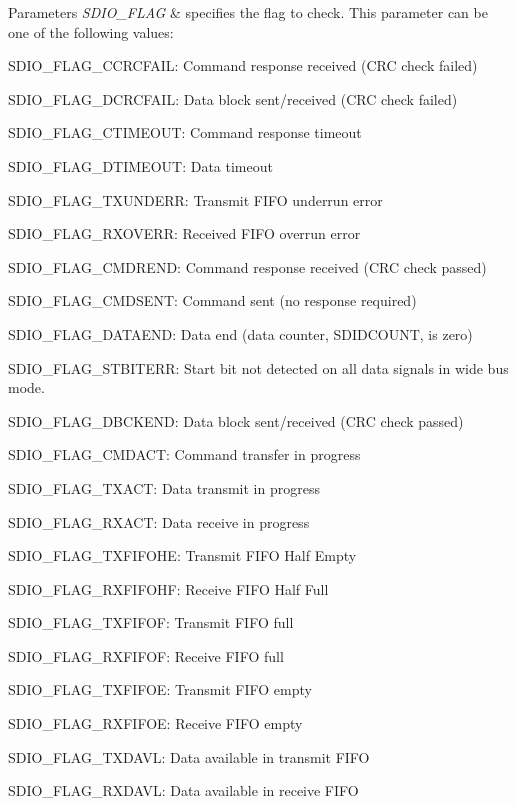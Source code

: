 \begin{DoxyParams}{Parameters}
{\em S\+D\+I\+O\+\_\+\+F\+L\+AG} & specifies the flag to check. This parameter can be one of the following values\+: \begin{DoxyItemize}
\item S\+D\+I\+O\+\_\+\+F\+L\+A\+G\+\_\+\+C\+C\+R\+C\+F\+A\+IL\+: Command response received (C\+RC check failed) \item S\+D\+I\+O\+\_\+\+F\+L\+A\+G\+\_\+\+D\+C\+R\+C\+F\+A\+IL\+: Data block sent/received (C\+RC check failed) \item S\+D\+I\+O\+\_\+\+F\+L\+A\+G\+\_\+\+C\+T\+I\+M\+E\+O\+UT\+: Command response timeout \item S\+D\+I\+O\+\_\+\+F\+L\+A\+G\+\_\+\+D\+T\+I\+M\+E\+O\+UT\+: Data timeout \item S\+D\+I\+O\+\_\+\+F\+L\+A\+G\+\_\+\+T\+X\+U\+N\+D\+E\+RR\+: Transmit F\+I\+FO underrun error \item S\+D\+I\+O\+\_\+\+F\+L\+A\+G\+\_\+\+R\+X\+O\+V\+E\+RR\+: Received F\+I\+FO overrun error \item S\+D\+I\+O\+\_\+\+F\+L\+A\+G\+\_\+\+C\+M\+D\+R\+E\+ND\+: Command response received (C\+RC check passed) \item S\+D\+I\+O\+\_\+\+F\+L\+A\+G\+\_\+\+C\+M\+D\+S\+E\+NT\+: Command sent (no response required) \item S\+D\+I\+O\+\_\+\+F\+L\+A\+G\+\_\+\+D\+A\+T\+A\+E\+ND\+: Data end (data counter, S\+D\+I\+D\+C\+O\+U\+NT, is zero) \item S\+D\+I\+O\+\_\+\+F\+L\+A\+G\+\_\+\+S\+T\+B\+I\+T\+E\+RR\+: Start bit not detected on all data signals in wide bus mode. \item S\+D\+I\+O\+\_\+\+F\+L\+A\+G\+\_\+\+D\+B\+C\+K\+E\+ND\+: Data block sent/received (C\+RC check passed) \item S\+D\+I\+O\+\_\+\+F\+L\+A\+G\+\_\+\+C\+M\+D\+A\+CT\+: Command transfer in progress \item S\+D\+I\+O\+\_\+\+F\+L\+A\+G\+\_\+\+T\+X\+A\+CT\+: Data transmit in progress \item S\+D\+I\+O\+\_\+\+F\+L\+A\+G\+\_\+\+R\+X\+A\+CT\+: Data receive in progress \item S\+D\+I\+O\+\_\+\+F\+L\+A\+G\+\_\+\+T\+X\+F\+I\+F\+O\+HE\+: Transmit F\+I\+FO Half Empty \item S\+D\+I\+O\+\_\+\+F\+L\+A\+G\+\_\+\+R\+X\+F\+I\+F\+O\+HF\+: Receive F\+I\+FO Half Full \item S\+D\+I\+O\+\_\+\+F\+L\+A\+G\+\_\+\+T\+X\+F\+I\+F\+OF\+: Transmit F\+I\+FO full \item S\+D\+I\+O\+\_\+\+F\+L\+A\+G\+\_\+\+R\+X\+F\+I\+F\+OF\+: Receive F\+I\+FO full \item S\+D\+I\+O\+\_\+\+F\+L\+A\+G\+\_\+\+T\+X\+F\+I\+F\+OE\+: Transmit F\+I\+FO empty \item S\+D\+I\+O\+\_\+\+F\+L\+A\+G\+\_\+\+R\+X\+F\+I\+F\+OE\+: Receive F\+I\+FO empty \item S\+D\+I\+O\+\_\+\+F\+L\+A\+G\+\_\+\+T\+X\+D\+A\+VL\+: Data available in transmit F\+I\+FO \item S\+D\+I\+O\+\_\+\+F\+L\+A\+G\+\_\+\+R\+X\+D\+A\+VL\+: Data available in receive F\+I\+FO 
\end{DoxyItemize}
\end{DoxyParams}
